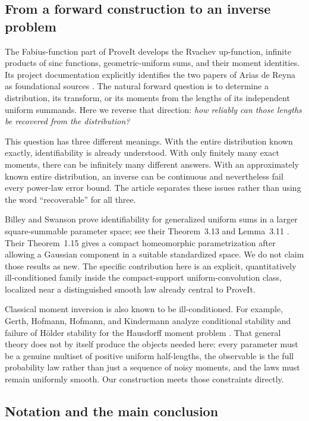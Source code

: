 \documentclass[11pt,a4paper]{article}
\theoremstyle{definition}
\theoremstyle{remark}
\begin{document}
\subsection{From a forward construction to an inverse problem}

The Fabius-function part of ProveIt develops the Rvachev up-function,
infinite products of sinc functions, geometric-uniform sums, and their
moment identities. Its project documentation explicitly identifies the two
papers of Arias de Reyna as foundational sources
\cite{ProveIt,AriasDefinition,AriasArithmetic}. The natural forward question
is to determine a distribution, its transform, or its moments from the
lengths of its independent uniform summands. Here we reverse that direction:
\emph{how reliably can those lengths be recovered from the distribution?}

This question has three different meanings. With the entire distribution
known exactly, identifiability is already understood. With only finitely
many exact moments, there can be infinitely many different answers. With
an approximately known entire distribution, an inverse can be continuous
and nevertheless fail every power-law error bound. The article separates
these issues rather than using the word ``recoverable'' for all three.

Billey and Swanson prove identifiability for generalized uniform sums in a
larger square-summable parameter space; see their Theorem~3.13 and
Lemma~3.11 \cite{BilleySwanson}. Their Theorem~1.15 gives a compact
homeomorphic parametrization after allowing a Gaussian component in a
suitable standardized space. We do not claim those results as new. The
specific contribution here is an explicit, quantitatively ill-conditioned
family inside the compact-support uniform-convolution class, localized near
a distinguished smooth law already central to ProveIt.

Classical moment inversion is also known to be ill-conditioned. For example,
Gerth, Hofmann, Hofmann, and Kindermann analyze conditional stability and
failure of H\"older stability for the Hausdorff moment problem
\cite{GerthEtAl}. That general theory does not by itself produce the objects
needed here: every parameter must be a genuine multiset of positive uniform
half-lengths, the observable is the full probability law rather than just a
sequence of noisy moments, and the laws must remain uniformly smooth.
Our construction meets those constraints directly.

\subsection{Notation and the main conclusion}
\end{document}
